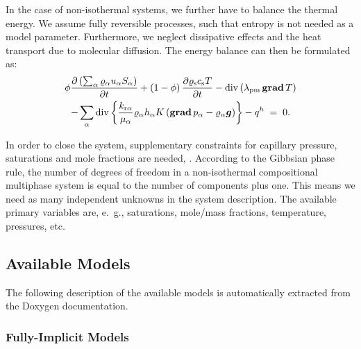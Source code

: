 In the case of non-isothermal systems, we further have to balance the
thermal energy. We assume fully reversible processes, such that entropy
is not needed as a model parameter. Furthermore, we neglect
dissipative effects and the heat transport due to molecular
diffusion. The energy balance can then be
formulated as:
%
\begin{multline}
  \label{A3:eqenergmak1}
  \phi \frac{\partial \left( \sum_\alpha \varrho_{\alpha}
      u_\alpha S_\alpha \right)}{\partial t} + \left( 1 -
    \phi \right) \frac{\partial \varrho_{\text{s}} c_{\text{s}}
    T}{\partial t}
 - \operatorname{div} \left( \lambda_{\text{pm}} \operatorname{\bf grad} T \right)
   \\
   - \sum\limits_\alpha \operatorname{div} \left\lbrace \frac{k_{\text{r}
        \alpha}}{\mu_\alpha} \varrho_{\alpha} h_\alpha
    K \left( \operatorname{\bf grad} p_\alpha - \varrho_{\alpha}
      \boldsymbol{g} \right) \right\rbrace
 - q^h \; = \; 0.
\end{multline}

In order to close the system, supplementary constraints for capillary pressure, saturations and mole
fractions are needed, \cite{A3:helmig:1997}.
According to the Gibbsian phase rule, the number of degrees of freedom
in a non-isothermal compositional multiphase system is equal to the
number of components plus one. This means we need as many independent
unknowns in the system description. The
available primary variables are, e.\ g., saturations, mole/mass
fractions, temperature, pressures, etc.

\subsection{Available Models}
The following description of the available models is automatically extracted
from the Doxygen documentation.



\subsubsection{Fully-Implicit Models}

